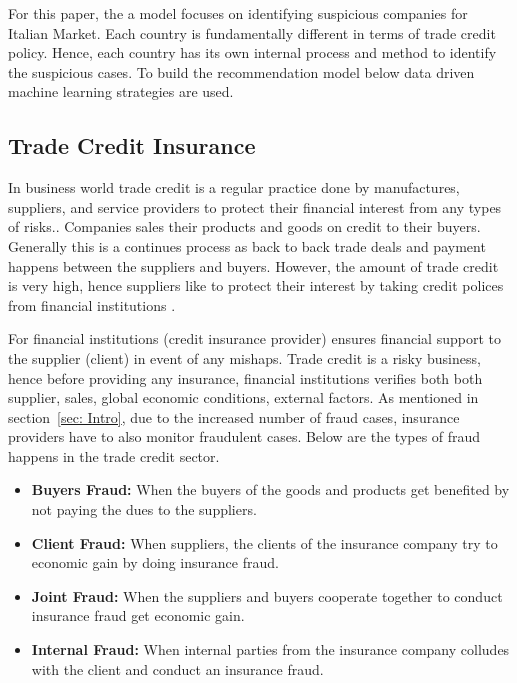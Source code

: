 For this paper, the a model focuses on identifying suspicious companies for Italian Market. Each country is fundamentally different in terms of trade credit policy. Hence, each country has its own internal process and method to identify the suspicious cases. To build the recommendation model below data driven machine learning strategies are used.


\subsection{Trade Credit Insurance}\label{subsec:trade-credit-insurance}
In business world trade credit is a regular practice done by manufactures, suppliers, and service providers to protect their financial interest from any types of risks.. Companies sales their products and goods on credit to their buyers. Generally this is a continues process as back to back trade deals and payment happens between the suppliers and buyers. However, the amount of trade credit is very high, hence suppliers like to protect their interest by taking credit polices from financial institutions  .

For financial institutions (credit insurance provider) ensures financial support to the supplier (client) in event of any mishaps. Trade credit is a risky business, hence before providing any insurance, financial institutions verifies both both supplier, sales, global economic conditions, external factors. As mentioned in section~\ref{sec: Intro}, due to the increased number of fraud cases, insurance providers have to also monitor fraudulent cases. Below are the types of fraud happens in the trade credit sector.

\begin{itemize}
    \item \textbf{Buyers Fraud:} When the buyers of the goods and products get benefited by not paying the dues to the suppliers.
    \item \textbf{Client Fraud:} When suppliers, the clients of the insurance company try to economic gain by doing insurance fraud.
    \item \textbf{Joint Fraud:} When the suppliers and buyers cooperate together to conduct insurance fraud get economic gain.
    \item \textbf{Internal Fraud:} When internal parties from the insurance company colludes with the client and conduct an insurance fraud.
\end{itemize}

